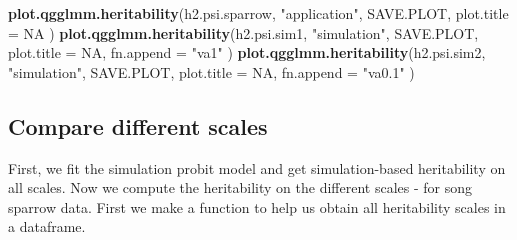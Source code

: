 \documentclass[
]{article}
\newenvironment{Shaded}{\begin{snugshade}}{\end{snugshade}}
\newcommand{\AttributeTok}[1]{\textcolor[rgb]{0.13,0.29,0.53}{#1}}
\newcommand{\ConstantTok}[1]{\textcolor[rgb]{0.56,0.35,0.01}{#1}}
\newcommand{\FunctionTok}[1]{\textcolor[rgb]{0.13,0.29,0.53}{\textbf{#1}}}
\newcommand{\NormalTok}[1]{#1}
\newcommand{\StringTok}[1]{\textcolor[rgb]{0.31,0.60,0.02}{#1}}
\begin{document}
\begin{Shaded}
\begin{Highlighting}[]
\FunctionTok{plot.qgglmm.heritability}\NormalTok{(h2.psi.sparrow, }\StringTok{"application"}\NormalTok{,}
\NormalTok{  SAVE.PLOT,}
  \AttributeTok{plot.title =} \ConstantTok{NA} 
\NormalTok{)}
\FunctionTok{plot.qgglmm.heritability}\NormalTok{(h2.psi.sim1, }\StringTok{"simulation"}\NormalTok{,}
\NormalTok{  SAVE.PLOT,}
  \AttributeTok{plot.title =} \ConstantTok{NA}\NormalTok{, }
  \AttributeTok{fn.append =} \StringTok{"va1"}
\NormalTok{)}
\FunctionTok{plot.qgglmm.heritability}\NormalTok{(h2.psi.sim2, }\StringTok{"simulation"}\NormalTok{,}
\NormalTok{  SAVE.PLOT,}
  \AttributeTok{plot.title =} \ConstantTok{NA}\NormalTok{, }
  \AttributeTok{fn.append =} \StringTok{"va0.1"}
\NormalTok{)}
\end{Highlighting}
\end{Shaded}

\hypertarget{compare-different-scales}{%
\subsection*{Compare different scales}\label{compare-different-scales}}

First, we fit the simulation probit model and get simulation-based
heritability on all scales. Now we compute the heritability on the
different scales - for song sparrow data. First we make a function to
help us obtain all heritability scales in a dataframe.
\end{document}
